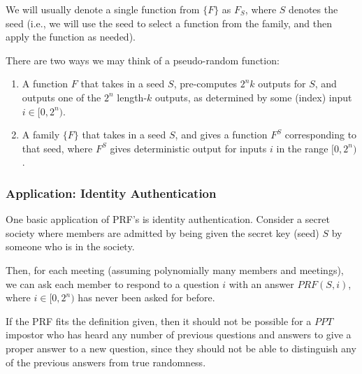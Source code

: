 \documentclass[11pt]{article}
\begin{document}
We will usually denote a single function from \(\{F\}\) as \(F_S\), where \(S\) denotes the seed (i.e., we will use the seed to select a function from the family, and then apply the function as needed).\bigskip

There are two ways we may think of a pseudo-random function:
\begin{enumerate}
\item A function \(F\) that takes in a seed \(S\), pre-computes \(2^nk\) outputs for \(S\), and outputs one of the \(2^n\) length-\(k\) outputs, as determined by some (index) input \(i\in[0,2^n)\).
\item A family \(\{F\}\) that takes in a seed \(S\), and gives a function \(F^S\) corresponding to that seed, where \(F^S\) gives deterministic output for inputs \(i\) in the range \([0,2^n)\).
\end{enumerate}
\subsubsection{Application: Identity Authentication}
One basic application of PRF's is identity authentication. Consider a secret society where members are admitted by being given the secret key (seed) \(S\) by someone who is in the society.\smallskip

Then, for each meeting (assuming polynomially many members and meetings), we can ask each member to respond to a question \(i\) with an answer \(PRF(S,i)\), where \(i\in[0,2^n)\) has never been asked for before.\smallskip

If the PRF fits the definition given, then it should not be possible for a \(PPT\) impostor who has heard any number of previous questions and answers to give a proper answer to a new question, since they should not be able to distinguish any of the previous answers from true randomness.


\newpage
\end{document}
